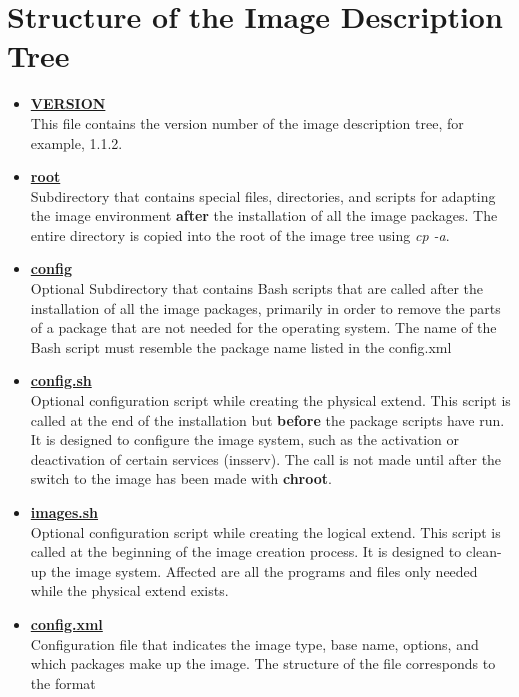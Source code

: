 \section{Structure of the Image Description Tree}
\label{imagetree}
\begin{itemize}

\item \textbf{\underline{VERSION}}\\
      This file contains the version number of the image description tree,
      for example, 1.1.2.
\item \textbf{\underline{root}}\\
      Subdirectory that contains special files, directories, and scripts for
      adapting the image environment \textbf{after} the installation of all the
      image packages. The entire directory is copied into the root of the
      image tree using \textit{cp -a}.
\item \textbf{\underline{config}}\\
      Optional Subdirectory that contains Bash scripts that are called
      after the installation of all the image packages, primarily in order
      to remove the parts of a package that are not needed for the operating
      system. The name of the Bash script must resemble the package name
      listed in the config.xml
\item \textbf{\underline{config.sh}}\\
      Optional configuration script while creating the physical extend. This
      script is called at the end of the installation but \textbf{before}
      the package scripts have run. It is designed to configure the image
      system, such as the activation or deactivation of certain services
      (insserv). The call is not made until after the switch to the image
      has been made with \textbf{chroot}.
\item \textbf{\underline{images.sh}}\\
      Optional configuration script while creating the logical extend.
      This script is called at the beginning of the image creation process.
      It is designed to clean-up the image system. Affected are all the
      programs and files only needed while the physical extend exists.
\item \textbf{\underline{config.xml}}\\
      Configuration file that indicates the image type, base name,
      options, and which packages make up the image. The structure of the
	  file corresponds to the format


\end{itemize}
